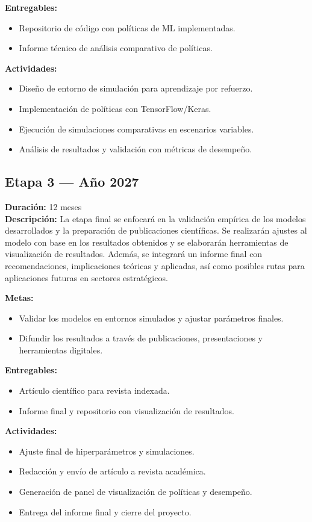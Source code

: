 \documentclass[12pt]{article}
\begin{document}
\textbf{Entregables:}
\begin{itemize}
  \item Repositorio de código con políticas de ML implementadas.
  \item Informe técnico de análisis comparativo de políticas.
\end{itemize}

\textbf{Actividades:}
\begin{itemize}
  \item Diseño de entorno de simulación para aprendizaje por refuerzo.
  \item Implementación de políticas con TensorFlow/Keras.
  \item Ejecución de simulaciones comparativas en escenarios variables.
  \item Análisis de resultados y validación con métricas de desempeño.
\end{itemize}

\subsection*{Etapa 3 — Año 2027}
\textbf{Duración:} 12 meses\\
\textbf{Descripción:} La etapa final se enfocará en la validación empírica de los modelos desarrollados y la preparación de publicaciones científicas. Se realizarán ajustes al modelo con base en los resultados obtenidos y se elaborarán herramientas de visualización de resultados. Además, se integrará un informe final con recomendaciones, implicaciones teóricas y aplicadas, así como posibles rutas para aplicaciones futuras en sectores estratégicos.

\textbf{Metas:}
\begin{itemize}
  \item Validar los modelos en entornos simulados y ajustar parámetros finales.
  \item Difundir los resultados a través de publicaciones, presentaciones y herramientas digitales.
\end{itemize}

\textbf{Entregables:}
\begin{itemize}
  \item Artículo científico para revista indexada.
  \item Informe final y repositorio con visualización de resultados.
\end{itemize}

\textbf{Actividades:}
\begin{itemize}
  \item Ajuste final de hiperparámetros y simulaciones.
  \item Redacción y envío de artículo a revista académica.
  \item Generación de panel de visualización de políticas y desempeño.
  \item Entrega del informe final y cierre del proyecto.
\end{itemize}
\end{document}
